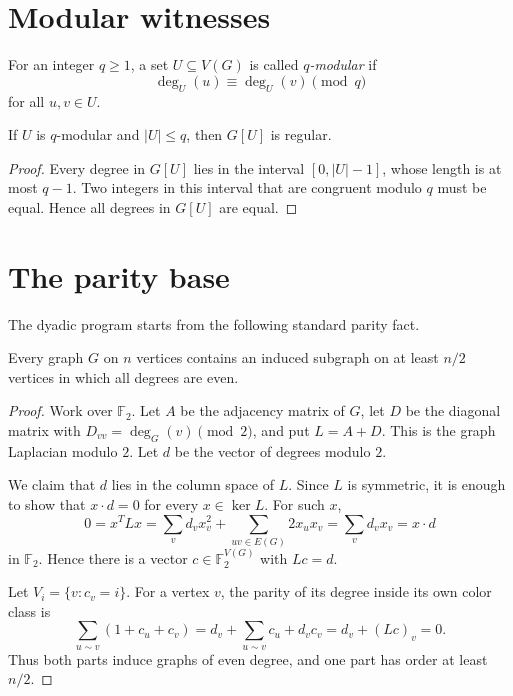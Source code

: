 \documentclass[thmsec,dntnbr,nolinenbrs]{dmgt}
\numberwithin{equation}{section}
\newcommand{\F}{\mathbb{F}}
\begin{document}
\section{Modular witnesses}

\begin{definition}
For an integer \(q\ge 1\), a set \(U\subseteq V(G)\) is called \emph{\(q\)-modular} if
\[
        \deg_U(u)\equiv \deg_U(v)\pmod q
\]
for all \(u,v\in U\).
\end{definition}

\begin{lemma}\label{lem:terminal}
If \(U\) is \(q\)-modular and \(|U|\le q\), then \(G[U]\) is regular.
\end{lemma}

\begin{proof}
Every degree in \(G[U]\) lies in the interval \([0,|U|-1]\), whose length is at most \(q-1\).  Two integers in this interval that are congruent modulo \(q\) must be equal.  Hence all degrees in \(G[U]\) are equal.
\end{proof}

\section{The parity base}

The dyadic program starts from the following standard parity fact.

\begin{lemma}\label{lem:parity}
Every graph \(G\) on \(n\) vertices contains an induced subgraph on at least \(n/2\) vertices in which all degrees are even.
\end{lemma}

\begin{proof}
Work over \(\F_2\).  Let \(A\) be the adjacency matrix of \(G\), let \(D\) be the diagonal matrix with \(D_{vv}=\deg_G(v)\pmod 2\), and put \(L=A+D\).  This is the graph Laplacian modulo \(2\).  Let \(d\) be the vector of degrees modulo \(2\).

We claim that \(d\) lies in the column space of \(L\).  Since \(L\) is symmetric, it is enough to show that \(x\cdot d=0\) for every \(x\in\ker L\).  For such \(x\),
\[
        0=x^T Lx
        =\sum_v d_vx_v^2+\sum_{uv\in E(G)}2x_ux_v
        =\sum_v d_vx_v
        =x\cdot d
\]
in \(\F_2\).  Hence there is a vector \(c\in \F_2^{V(G)}\) with \(Lc=d\).

Let \(V_i=\{v:c_v=i\}\).  For a vertex \(v\), the parity of its degree inside its own color class is
\[
        \sum_{u\sim v}(1+c_u+c_v)
        =d_v+\sum_{u\sim v}c_u+d_vc_v
        =d_v+(Lc)_v
        =0.
\]
Thus both parts induce graphs of even degree, and one part has order at least \(n/2\).
\end{proof}
\end{document}
